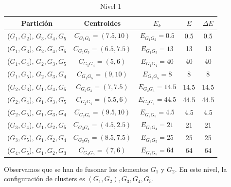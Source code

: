 \begin{ejemplo}
    \begin{table}[h]
        \centering
        \begin{tabular}{| c | c | c | c | c |}
            \hline
            \textbf{Partición} & \textbf{Centroides} & \(E_{k}\) & \(E\) & \(\Delta E\) \\
            \hline
            (\(G_{1}, G_{2}\)), \(G_{3}, G_{4}, G_{5}\) & \(C_{G_{1}G_{2}} = (7.5, 10)\) & \(E_{G_{1}G_{2}} = 0.5\) & 0.5 & 0.5 \\
            \hline
            (\(G_{1}, G_{3}\)), \(G_{2}, G_{4}, G_{5}\) & \(C_{G_{1}G_{3}} = (6.5, 7.5)\) & \(E_{G_{1}G_{3}} = 13\) & 13 & 13 \\
            \hline
            (\(G_{1}, G_{4}\)), \(G_{2}, G_{3}, G_{5}\) & \(C_{G_{1}G_{4}} = (5, 6)\) & \(E_{G_{1}G_{4}} = 40\) & 40 & 40 \\
            \hline
            (\(G_{1}, G_{5}\)), \(G_{2}, G_{3}, G_{4}\) & \(C_{G_{1}G_{5}} = (9, 10)\) & \(E_{G_{1}G_{5}} = 8\) & 8 & 8 \\
            \hline
            (\(G_{2}, G_{3}\)), \(G_{1}, G_{4}, G_{5}\) & \(C_{G_{2}G_{3}} = (7, 7.5)\) & \(E_{G_{2}G_{3}} = 14.5\) & 14.5 & 14.5 \\
            \hline
            (\(G_{2}, G_{4}\)), \(G_{1}, G_{3}, G_{5}\) & \(C_{G_{2}G_{4}} = (5.5, 6)\) & \(E_{G_{2}G_{4}} = 44.5\) & 44.5 & 44.5 \\
            \hline
            (\(G_{2}, G_{5}\)), \(G_{1}, G_{3}, G_{4}\) & \(C_{G_{2}G_{5}} = (9.5, 10)\) & \(E_{G_{2}G_{5}} = 4.5\) & 4.5 & 4.5 \\
            \hline
            (\(G_{3}, G_{4}\)), \(G_{1}, G_{2}, G_{5}\) & \(C_{G_{3}G_{4}} = (4.5, 2.5)\) & \(E_{G_{3}G_{4}} = 21\) & 21 & 21 \\
            \hline
            (\(G_{3}, G_{5}\)), \(G_{1}, G_{2}, G_{4}\) & \(C_{G_{3}G_{5}} = (8.5, 7.5)\) & \(E_{G_{3}G_{5}} = 25\) & 25 & 25 \\
            \hline
            (\(G_{4}, G_{5}\)), \(G_{1}, G_{2}, G_{3}\) & \(C_{G_{4}G_{5}} = (7, 6)\) & \(E_{G_{4}G_{5}} = 64\) & 64 & 64 \\
            \hline
        \end{tabular}
        \caption{Nivel 1}
        
    \end{table}

    Observamos que se han de fusonar los elementos $G_{1}$ y $G_{2}$. En este nivel, la configuración de clusters es $(G_{1},G_{2}),G_{3},G_{4},G_{5}$. \newline


\end{ejemplo}
